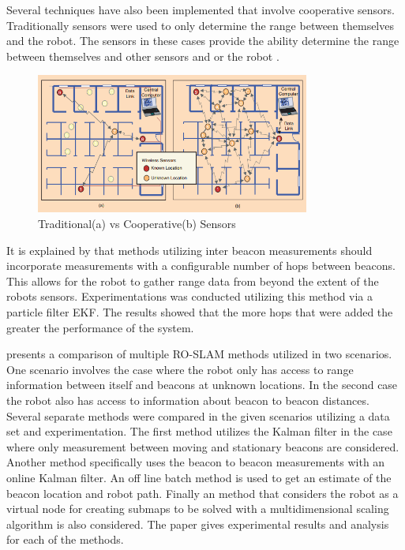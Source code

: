 \documentclass[conference]{IEEEtran}
\begin{document}
	
	
	Several techniques have also been implemented that involve cooperative sensors. Traditionally sensors were used to only determine the range between themselves and the robot. The sensors in these cases provide the ability determine the range between themselves and other sensors and or the robot \cite{Patwari2005}.
	
	\begin{figure}[h!]
		
		\centering
		
		\includegraphics[width=90mm]{coop_loc_comp_patwari.png}
		
		\caption{Traditional(a) vs Cooperative(b) Sensors \cite{Patwari2005}}
		
		\label{trad_vs_coop_sensors}
		
	\end{figure}
	
	\FloatBarrier
	
	
	It is explained by \cite{Torres-Gonzalez2015} that methods utilizing inter beacon measurements should incorporate measurements with a configurable number of hops between beacons. This allows for the robot to gather range data from beyond the extent of the robots sensors. Experimentations was conducted utilizing this method via a particle filter EKF. The results showed that the more hops that were added the greater the performance of the system. 
	
	
	
	\cite{Djugash2006} presents a comparison of multiple RO-SLAM methods utilized in two scenarios. One scenario involves the case where the robot only has access to range information between itself and beacons at unknown locations. In the second case the robot also has access to information about beacon to beacon distances. Several separate methods were compared in the given scenarios utilizing a data set and experimentation. The first method utilizes the Kalman filter in the case where only measurement between moving and stationary beacons are considered. Another method specifically uses the beacon to beacon measurements with an online Kalman filter. An off line batch method is used to get an estimate of the beacon location and robot path. Finally an method that considers the robot as a virtual node for creating submaps to be solved with a multidimensional scaling algorithm is also considered. The paper gives experimental results and analysis for each of the methods. 
	
\end{document}
